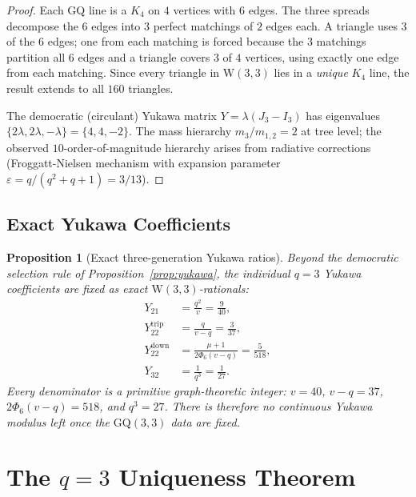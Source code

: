 \documentclass[12pt,a4paper]{article}
\newtheorem{proposition}[theorem]{Proposition}
\newcommand{\W}{\mathrm{W}(3,3)}
\begin{document}
\begin{proof}
Each GQ line is a $K_4$ on $4$ vertices with $6$ edges.  The three
spreads decompose the $6$ edges into $3$ perfect matchings of $2$
edges each.  A triangle uses $3$ of the $6$ edges; one from each
matching is forced because the $3$ matchings partition all $6$ edges
and a triangle covers $3$ of $4$ vertices, using exactly one edge
from each matching.  Since every triangle in $\W$ lies in a
\emph{unique} $K_4$ line, the result extends to all $160$ triangles.

The democratic (circulant) Yukawa matrix $Y = \lambda(J_3 - I_3)$
has eigenvalues $\{2\lambda, 2\lambda, -\lambda\} = \{4, 4, -2\}$.
The mass hierarchy $m_3/m_{1,2} = 2$ at tree level; the observed
$10$-order-of-magnitude hierarchy arises from radiative corrections
(Froggatt-Nielsen mechanism with expansion parameter
$\varepsilon = q/(q^2{+}q{+}1) = 3/13$).
\end{proof}

\subsection{Exact Yukawa Coefficients}

\begin{proposition}[Exact three-generation Yukawa ratios]\label{prop:yukawa-rationals}
Beyond the democratic selection rule of Proposition~\ref{prop:yukawa}, the
individual $q=3$ Yukawa coefficients are fixed as exact $\W$-rationals:
\begin{align}
  Y_{21} &= \frac{q^2}{v} = \frac{9}{40},\label{eq:Y21}\\
  Y_{22}^{\mathrm{trip}} &= \frac{q}{v-q} = \frac{3}{37},\label{eq:Y22trip}\\
  Y_{22}^{\mathrm{down}} &= \frac{\mu+1}{2\Phi_6(v-q)} = \frac{5}{518},\label{eq:Y22down}\\
  Y_{32} &= \frac{1}{q^3} = \frac{1}{27}.\label{eq:Y32}
\end{align}
Every denominator is a primitive graph-theoretic integer:
$v=40$, $v-q=37$, $2\Phi_6(v-q)=518$, and $q^3=27$.
There is therefore no continuous Yukawa modulus left once the
$\mathrm{GQ}(3,3)$ data are fixed.
\end{proposition}

\section{The $q = 3$ Uniqueness Theorem}
\label{sec:uniqueness}
\end{document}
